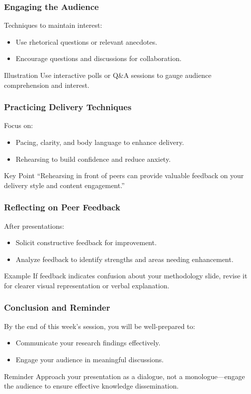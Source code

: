 \documentclass[aspectratio=169]{beamer}
\begin{document}
\begin{frame}[fragile]
    \frametitle{Engaging the Audience}
    Techniques to maintain interest:
    \begin{itemize}
        \item Use rhetorical questions or relevant anecdotes.
        \item Encourage questions and discussions for collaboration.
    \end{itemize}
    \begin{block}{Illustration}
        Use interactive polls or Q\&A sessions to gauge audience comprehension and interest.
    \end{block}
\end{frame}

\begin{frame}[fragile]
    \frametitle{Practicing Delivery Techniques}
    Focus on:
    \begin{itemize}
        \item Pacing, clarity, and body language to enhance delivery.
        \item Rehearsing to build confidence and reduce anxiety.
    \end{itemize}
    \begin{block}{Key Point}
        ``Rehearsing in front of peers can provide valuable feedback on your delivery style and content engagement.''
    \end{block}
\end{frame}

\begin{frame}[fragile]
    \frametitle{Reflecting on Peer Feedback}
    After presentations:
    \begin{itemize}
        \item Solicit constructive feedback for improvement.
        \item Analyze feedback to identify strengths and areas needing enhancement.
    \end{itemize}
    \begin{block}{Example}
        If feedback indicates confusion about your methodology slide, 
        revise it for clearer visual representation or verbal explanation.
    \end{block}
\end{frame}

\begin{frame}[fragile]
    \frametitle{Conclusion and Reminder}
    By the end of this week’s session, you will be well-prepared to:
    \begin{itemize}
        \item Communicate your research findings effectively.
        \item Engage your audience in meaningful discussions.
    \end{itemize}
    \begin{block}{Reminder}
        Approach your presentation as a dialogue, not a monologue—engage the audience to ensure effective knowledge dissemination.
    \end{block}
\end{frame}
\end{document}

